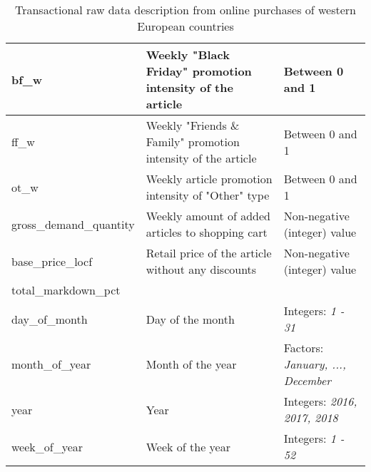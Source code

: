 \begin{table}[H]
\begin{adjustbox}{max width=\textwidth}
\begin{tabular}{|l|l|l|}
 \hline
bf\_w                   & Weekly "Black Friday" promotion intensity of the article                                                                    & Between 0 and 1              \\ \hline
ff\_w                   & Weekly "Friends \& Family" promotion intensity of the article                                                               & Between 0 and 1              \\ \hline
ot\_w                   & Weekly article promotion intensity of "Other" type                                                                          & Between 0 and 1              \\ \hline
gross\_demand\_quantity & Weekly amount of added articles to shopping cart                                                                            & Non-negative (integer) value \\ \hline
base\_price\_locf       & Retail price of the article without any discounts                                                                           & Non-negative (integer) value \\ \hline
total\_markdown\_pct    &                                                                                                                             &                              \\ \hline
day\_of\_month          & Day of the month                                                                                                            & Integers: \textit{1 - 31}                       \\ \hline
month\_of\_year         & Month of the year                                                                                                           & Factors: \textit{January, ..., December}       \\ \hline
year                    & Year                                                                                                                        & Integers: \textit{2016, 2017, 2018}             \\ \hline
week\_of\_year          & Week of the year                                                                                                            & Integers: \textit{1 - 52}                       \\ \hline
\end{tabular}
\end{adjustbox}
\caption{Transactional raw data description from online purchases of western European countries}
\label{tab:transactional_data}
\end{table}

